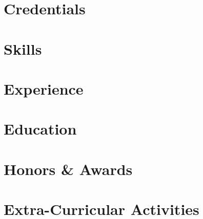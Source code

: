 \documentclass[letter,10pt]{article}
\begin{document}
\thispagestyle{firstpage}



\section{Credentials}
% 


\section{Skills}


\section{Experience}


\thispagestyle{default}
\setlength{\headheight}{0.55in}
\setlength{\headsep}{0pt}

\section{Education}


\section{Honors \& Awards}


\section{Extra-Curricular Activities}

\end{document}
